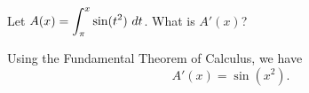 \begin{example} %
Let $\ds A(x) = \int_{\pi}^x \sin(t^2) \ dt$.  What is $A'(x)$?

\solution Using the Fundamental Theorem of Calculus, we have 
\[ A'(x) = \sin(x^2). \]
\end{example}
